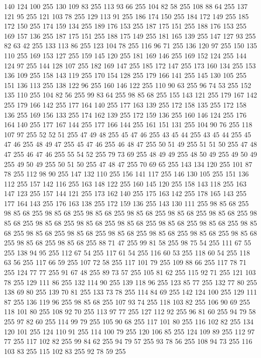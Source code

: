 140 124 100 255 130 109 83 255 113 93 66 255 104 82 58 255 108 88 64 255 137 121 95 255 121 103 78 255 129 113 91 255 186 174 150 255 184 172 149 255 185 172 150 255 174 159 134 255 189 176 153 255 187 175 151 255 188 176 153 255 169 157 136 255 187 175 151 255 188 175 149 255 181 165 139 255 147 127 93 255 82 63 42 255 133 113 86 255 123 104 78 255 116 96 71 255 136 120 97 255 150 135 110 255 169 153 127 255 159 145 120 255 181 169 146 255 169 152 124 255 144 124 97 255 144 128 107 255 182 169 147 255 185 172 147 255 173 160 134 255 153 136 109 255 158 143 119 255 170 154 128 255 179 166 141 255 145 130 105 255 151 136 113 255 138 122 96 255 160 146 122 255 110 90 63 255 96 74 53 255 152 135 110 255 104 82 56 255 99 83 64 255 98 85 68 255 155 143 121 255 179 167 142 255 179 166 142 255 177 164 140 255 177 163 139 255 172 158 135 255 172 158 136 255 169 156 133 255 174 162 139 255 172 159 136 255 160 146 124 255 176 164 140 255 177 167 144 255 177 166 144 255 161 151 131 255
104 90 76 255 118 107 97 255 52 52 51 255 47 49 48 255 45 47 46 255 43 45 44 255 43 45 44 255 45 47 46 255 48 49 47 255 45 47 46 255 46 48 47 255 50 51 49 255 51 51 50 255 47 48 47 255 46 47 46 255 55 54 52 255 79 73 69 255 48 49 49 255 48 50 49 255 49 50 49 255 49 50 49 255 50 51 50 255 47 48 47 255 70 69 65 255 143 134 120 255 101 87 78 255 112 98 90 255 147 132 110 255 156 141 117 255 146 130 105 255 151 136 112 255 157 142 116 255 163 148 122 255 160 145 120 255 158 143 118 255 163 147 123 255 157 144 121 255 173 162 140 255 175 163 142 255 178 165 143 255 177 164 143 255 176 163 138 255 172 159 136 255 143 130 111 255 98 85 68 255 98 85 68 255 98 85 68 255 98 85 68 255 98 85 68 255 98 85 68 255 98 85 68 255 98 85 68 255 98 85 68 255 98 85 68 255 98 85 68 255 98 85 68 255 98 85 68 255 98 85 68 255 98 85 68 255 98 85 68 255 98 85 68 255 98 85 68 255 98 85 68 255 98 85 68 255
98 85 68 255 98 85 68 255 88 71 47 255 99 81 58 255 98 75 54 255 111 67 55 255 138 94 95 255 112 67 54 255 117 61 54 255 116 60 53 255 118 60 54 255 118 63 56 255 117 66 59 255 107 72 58 255 117 101 79 255 109 88 66 255 117 78 71 255 124 77 77 255 91 67 48 255 89 73 57 255 105 81 62 255 115 92 71 255 121 103 78 255 129 111 86 255 132 114 90 255 139 118 96 255 123 85 77 255 132 77 80 255 138 69 80 255 139 70 81 255 133 73 78 255 114 84 69 255 142 124 100 255 129 111 87 255 136 119 96 255 98 85 68 255 107 93 74 255 118 103 82 255 106 90 69 255 118 101 80 255 108 92 70 255 113 97 77 255 127 112 92 255 96 81 60 255 94 79 58 255 97 82 60 255 114 99 79 255 105 90 68 255 117 101 80 255 116 102 82 255 134 120 101 255 124 110 91 255 114 100 79 255 120 106 85 255 124 109 89 255 112 97 77 255 117 102 82 255 99 84 62 255 94 79 57 255 93 78 56 255 108 94 73 255 116 103 83 255 115 102 83 255 92 78 59 255

